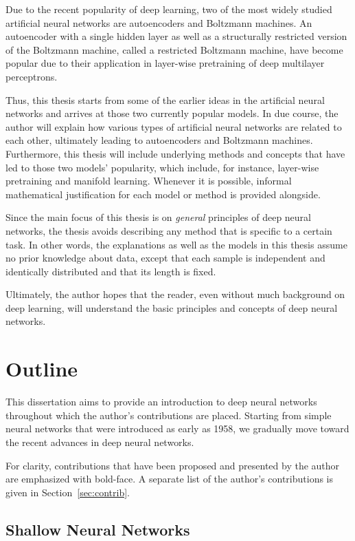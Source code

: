 \documentclass{now}
\begin{document}
Due to the recent popularity of deep learning, two of
the most widely studied artificial neural networks are
autoencoders and Boltzmann machines.  An autoencoder with a
single hidden layer as well as a structurally restricted
version of the Boltzmann machine, called a restricted
Boltzmann machine, have become popular due to their
application in layer-wise pretraining of deep multilayer
perceptrons. 

Thus, this thesis starts from some of the earlier ideas in
the artificial neural networks and arrives at those two
currently popular models. In due course, the author will
explain how various types of artificial neural networks are
related to each other, ultimately leading to autoencoders
and Boltzmann machines. Furthermore, this thesis will
include underlying methods and concepts that have led to
those two models' popularity, which include, for instance,
layer-wise pretraining and manifold learning.  Whenever it
is possible, informal mathematical justification for each
model or method is provided alongside.

Since the main focus of this thesis is on \textit{general}
principles of deep neural networks, the thesis 
avoids describing any method that is specific to a certain
task. In other words, the explanations as well as the models
in this thesis assume no prior knowledge about data, except
that each sample is independent and identically distributed
and that its length is fixed. 

Ultimately, the author hopes that the reader, even without
much background on deep learning, will understand the basic
principles and concepts of deep neural networks. 


\section{Outline}

This dissertation aims to provide an introduction to deep
neural networks throughout which the author's contributions
are placed. Starting from simple neural networks that were
introduced as early as 1958, we gradually move toward the
recent advances in deep neural networks. 

For clarity, contributions that have been proposed and presented by
the author are emphasized with bold-face. A separate list of
the author's contributions is given in
Section~\ref{sec:contrib}.

\subsection{Shallow Neural Networks}
\end{document}
